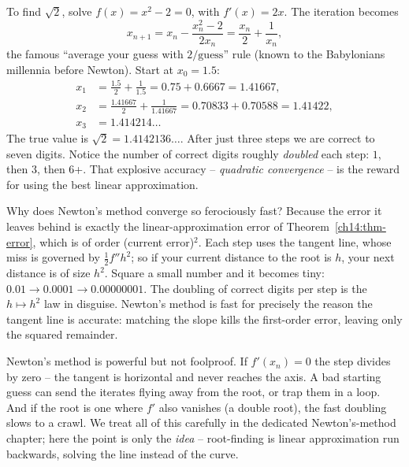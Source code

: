 \begin{example}
\label{ch14:ex-newton-sqrt2}
To find $\sqrt 2$, solve $f(x)=x^2-2=0$, with $f'(x)=2x$. The iteration becomes
\[
x_{n+1} = x_n - \frac{x_n^2 - 2}{2x_n} = \frac{x_n}{2} + \frac{1}{x_n},
\]
the famous ``average your guess with $2/\text{guess}$'' rule (known to the
Babylonians millennia before Newton). Start at $x_0 = 1.5$:
\[
\begin{aligned}
x_1 &= \tfrac{1.5}{2} + \tfrac{1}{1.5} = 0.75 + 0.6667 = 1.41667,\\
x_2 &= \tfrac{1.41667}{2} + \tfrac{1}{1.41667} = 0.70833 + 0.70588 = 1.41422,\\
x_3 &= 1.414214\ldots
\end{aligned}
\]
The true value is $\sqrt 2 = 1.4142136\ldots$. After just three steps we are
correct to seven digits. Notice the number of correct digits roughly
\emph{doubled} each step: $1$, then $3$, then $6$+. That explosive accuracy --
\emph{quadratic convergence} -- is the reward for using the best linear
approximation.
\end{example}

\begin{whybox}
Why does Newton's method converge so ferociously fast? Because the error it leaves
behind is exactly the linear-approximation error of Theorem~\ref{ch14:thm-error},
which is of order (current error)$^2$. Each step uses the tangent line, whose miss
is governed by $\tfrac12 f'' h^2$; so if your current distance to the root is $h$,
your next distance is of size $h^2$. Square a small number and it becomes tiny:
$0.01 \to 0.0001 \to 0.00000001$. The doubling of correct digits per step is the
$h \mapsto h^2$ law in disguise. Newton's method is fast for precisely the reason
the tangent line is accurate: matching the slope kills the first-order error,
leaving only the squared remainder.
\end{whybox}

\begin{trapbox}
Newton's method is powerful but not foolproof. If $f'(x_n)=0$ the step divides by
zero -- the tangent is horizontal and never reaches the axis. A bad starting guess
can send the iterates flying away from the root, or trap them in a loop. And if
the root is one where $f'$ also vanishes (a double root), the fast doubling slows
to a crawl. We treat all of this carefully in the dedicated Newton's-method
chapter; here the point is only the \emph{idea} -- root-finding is linear
approximation run backwards, solving the line instead of the curve.
\end{trapbox}

